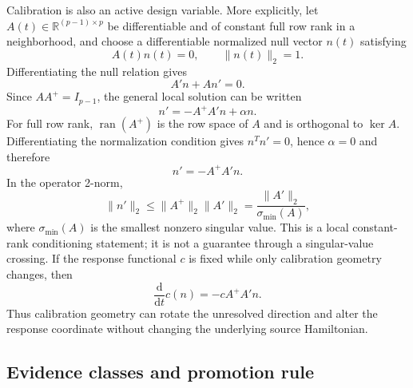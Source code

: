 \documentclass[11pt]{article}
\newcommand{\dd}{\mathrm{d}}
\begin{document}
Calibration is also an active design variable. More explicitly, let $A(t)\in\mathbb R^{(p-1)\times p}$ be differentiable and of constant full row rank in a neighborhood, and choose a differentiable normalized null vector $n(t)$ satisfying
\begin{equation}
 A(t)n(t)=0,\qquad \lVert n(t)\rVert_2=1.
\end{equation}
Differentiating the null relation gives
\begin{equation}
 A'n+An'=0.
\end{equation}
Since $AA^+=I_{p-1}$, the general local solution can be written
\begin{equation}
 n'=-A^+A'n+\alpha n.
\end{equation}
For full row rank, $\operatorname{ran}(A^+)$ is the row space of $A$ and is orthogonal to $\ker A$. Differentiating the normalization condition gives $n^Tn'=0$, hence $\alpha=0$ and therefore
\begin{equation}
 n'=-A^+A'n.
\end{equation}
In the operator 2-norm,
\begin{equation}
 \lVert n'\rVert_2\leq \lVert A^+\rVert_2\lVert A'\rVert_2
 =\frac{\lVert A'\rVert_2}{\sigma_{\min}(A)},
\end{equation}
where $\sigma_{\min}(A)$ is the smallest nonzero singular value. This is a local constant-rank conditioning statement; it is not a guarantee through a singular-value crossing. If the response functional $c$ is fixed while only calibration geometry changes, then
\begin{equation}
 \frac{\dd}{\dd t}c(n)=-cA^+A'n.
\end{equation}
Thus calibration geometry can rotate the unresolved direction and alter the response coordinate without changing the underlying source Hamiltonian.

\subsection{Evidence classes and promotion rule}
\end{document}
